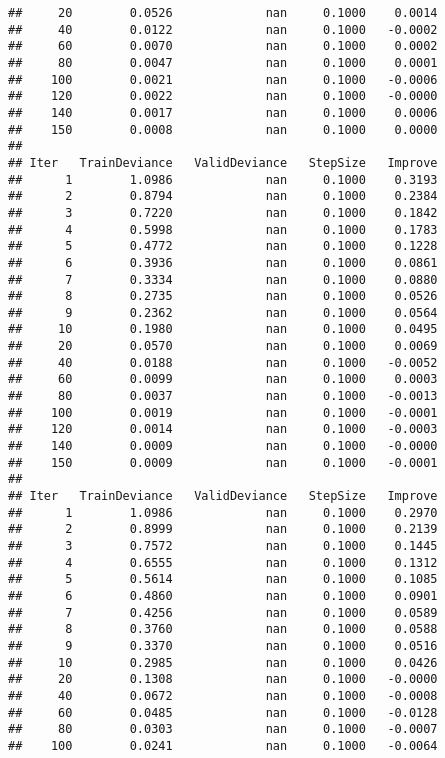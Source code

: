 \documentclass[
]{article}
\begin{document}
\begin{verbatim}
##     20        0.0526             nan     0.1000    0.0014
##     40        0.0122             nan     0.1000   -0.0002
##     60        0.0070             nan     0.1000    0.0002
##     80        0.0047             nan     0.1000    0.0001
##    100        0.0021             nan     0.1000   -0.0006
##    120        0.0022             nan     0.1000   -0.0000
##    140        0.0017             nan     0.1000    0.0006
##    150        0.0008             nan     0.1000    0.0000
## 
## Iter   TrainDeviance   ValidDeviance   StepSize   Improve
##      1        1.0986             nan     0.1000    0.3193
##      2        0.8794             nan     0.1000    0.2384
##      3        0.7220             nan     0.1000    0.1842
##      4        0.5998             nan     0.1000    0.1783
##      5        0.4772             nan     0.1000    0.1228
##      6        0.3936             nan     0.1000    0.0861
##      7        0.3334             nan     0.1000    0.0880
##      8        0.2735             nan     0.1000    0.0526
##      9        0.2362             nan     0.1000    0.0564
##     10        0.1980             nan     0.1000    0.0495
##     20        0.0570             nan     0.1000    0.0069
##     40        0.0188             nan     0.1000   -0.0052
##     60        0.0099             nan     0.1000    0.0003
##     80        0.0037             nan     0.1000   -0.0013
##    100        0.0019             nan     0.1000   -0.0001
##    120        0.0014             nan     0.1000   -0.0003
##    140        0.0009             nan     0.1000   -0.0000
##    150        0.0009             nan     0.1000   -0.0001
## 
## Iter   TrainDeviance   ValidDeviance   StepSize   Improve
##      1        1.0986             nan     0.1000    0.2970
##      2        0.8999             nan     0.1000    0.2139
##      3        0.7572             nan     0.1000    0.1445
##      4        0.6555             nan     0.1000    0.1312
##      5        0.5614             nan     0.1000    0.1085
##      6        0.4860             nan     0.1000    0.0901
##      7        0.4256             nan     0.1000    0.0589
##      8        0.3760             nan     0.1000    0.0588
##      9        0.3370             nan     0.1000    0.0516
##     10        0.2985             nan     0.1000    0.0426
##     20        0.1308             nan     0.1000   -0.0000
##     40        0.0672             nan     0.1000   -0.0008
##     60        0.0485             nan     0.1000   -0.0128
##     80        0.0303             nan     0.1000   -0.0007
##    100        0.0241             nan     0.1000   -0.0064

\end{verbatim}
\end{document}
